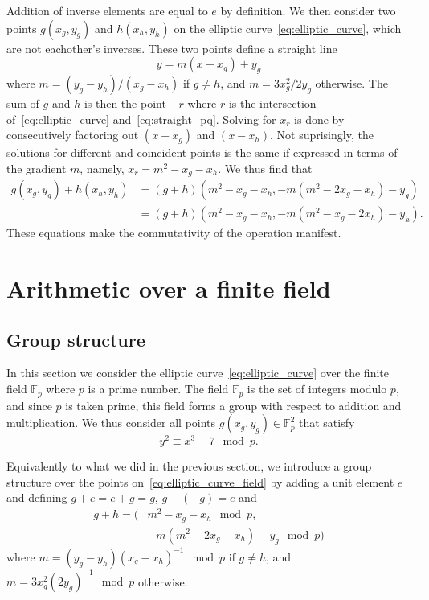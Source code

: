 \documentclass{article}
\begin{document}
Addition of inverse elements are equal to $e$ by definition. We then
consider two points $g(x_g, y_g)$ and $h(x_h, y_h)$ on the elliptic
curve~\eqref{eq:elliptic_curve}, which are not eachother's inverses. These two
points define a straight line
\begin{equation}
    \label{eq:straight_pq}
    y = m (x - x_g) + y_g
\end{equation}
where $m = (y_g - y_h) / (x_g - x_h)$ if $g \neq h$, and $m = 3 x_g^2 / 2 y_g$
otherwise. The sum of $g$ and $h$ is then the point $-r$ where $r$ is the
intersection of~\eqref{eq:elliptic_curve} and~\eqref{eq:straight_pq}. Solving
for $x_r$ is done by consecutively factoring out $(x - x_g)$ and $(x - x_h)$.
Not suprisingly, the solutions for different and coincident points is the same
if expressed in terms of the gradient $m$, namely, $x_r = m^2 - x_g - x_h$. We
thus find that
\begin{equation}
\begin{split}
    g(x_g, y_g) + h(x_h, y_h) 
    &= (g + h)(
        m^2 - x_g - x_h, 
        -m (m^2 - 2x_g - x_h) - y_g)\\
    &= (g + h)(
        m^2 - x_g - x_h, 
        -m (m^2 - x_g - 2x_h) - y_h).
\end{split}
\end{equation}
These equations make the commutativity of the operation manifest.


\section{Arithmetic over a finite field}

\subsection{Group structure}

In this section we consider the elliptic curve~\eqref{eq:elliptic_curve} over
the finite field $\mathbb{F}_p$ where $p$ is a prime number. The field
$\mathbb{F}_p$ is the set of integers modulo $p$, and since $p$ is taken prime,
this field forms a group with respect to addition and multiplication. We thus
consider all points $g(x_g, y_g) \in \mathbb{F}_p^2$ that satisfy
\begin{equation} \label{eq:elliptic_curve_field} 
    y^2 \equiv x^3 + 7 \mod p.
\end{equation} 

Equivalently to what we did in the previous section, we introduce a group
structure over the points on~\eqref{eq:elliptic_curve_field} by adding a unit
element $e$ and defining $g + e = e + g = g$, $g + (-g) = e$ and
\begin{equation}
\begin{split}
    g + h = (&m^2 - x_g - x_h \mod p, \\
             &-m (m^2 - 2x_g - x_h) - y_g \mod p)
\end{split}
\end{equation}
where $m = (y_g - y_h)(x_g - x_h)^{-1} \mod p$ if $g \neq h$, and $m = 3 x_g^2 (2
y_g)^{-1} \mod p$ otherwise.
\end{document}
